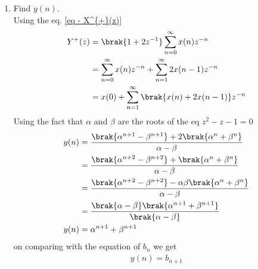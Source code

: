 \documentclass[journal,12pt,twocolumn]{IEEEtran}
\renewcommand\thesection{\arabic{section}}
\begin{document}
\begin{enumerate}[label=\thesection.\arabic*,ref=\thesection.\theenumi]
\item Find $y(n)$.\\
\solution Using the eq. \ref{eq - X^{+}(z)}
\begin{align}
Y^{+}(z) &= \brak{1+2z^{-1}} \sum_{n=0}^{\infty} x(n) z^{-n}\\ &= \sum_{n=0}^{\infty} x(n) z^{-n} + \sum_{n=1}^{\infty} 2x(n-1) z^{-n}\\ &= x(0) + \sum_{n=1}^{\infty} \brak{x(n) + 2x(n-1)} z^{-n}
\end{align}
Using the fact that $\alpha$ and $\beta$ are the roots of the eq $z^2-z-1 = 0$
\begin{align}
y(n) &= \frac{\brak{{\alpha}^{n+1} - {\beta}^{n+1}} + 2\brak{{\alpha}^{n} + {\beta}^n}}{\alpha - \beta}\\ &= \frac{\brak{{\alpha}^{n+2} - {\beta}^{n+2}} + \brak{{\alpha}^{n} + {\beta}^n}}{\alpha - \beta}\\ &= \frac{\brak{{\alpha}^{n+2} - {\beta}^{n+2}} -\alpha \beta \brak{{\alpha}^{n} + {\beta}^n}}{\alpha - \beta}\\ &= \frac{\brak{\alpha - \beta}\brak{{\alpha}^{n+1} + {\beta}^{n+1}}}{\brak{\alpha - \beta}}\\ y(n) &= {\alpha}^{n+1} + {\beta}^{n+1}
\end{align}
on comparing with the equation of $b_n$ we get
\begin{align*}
y(n) = b_{n+1}
\end{align*}

\end{enumerate}
\end{document}
